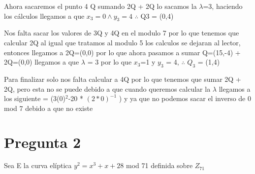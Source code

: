 \documentclass[10pt,a4paper]{article}
\begin{document}
\begin{itemize}
Ahora sacaremos el punto 4 Q sumando 2Q + 2Q lo sacamos la $\lambda$=3, haciendo los cálculos llegamos a que $x_3 =0 \land y_3= 4$ $\therefore$ Q3 = (0,4)\vspace{.3cm}

Nos falta sacar los valores de 3Q y 4Q en el modulo 7 por lo que tenemos que calcular 2Q al igual que tratamos al modulo 5 los calculos se dejaran al lector, entonces llegamos a 2Q=(0,0) por lo que ahora   pasamos a sumar Q=(15,-4) + 2Q=(0,0)  llegamos a que $\lambda$ = 3  por lo que $x_3$=1 y $y_3$ = 4, $\therefore$ $Q_3$ = (1,4) \vspace{.3cm}

Para finalizar solo nos falta calcular a 4Q por lo que tenemos que sumar 2Q + 2Q, pero esta no se puede debido a que cuando queremos calcular la $\lambda$ llegamos a los siguiente = (3(0)$^2$-20 * $(2*0)^{-1}$ ) y ya que no podemos sacar el inverso de 0 mod 7 debido a que no existe  \vspace{.3cm}    

\end{itemize}

\section{Pregunta 2}

Sea E la curva elíptica $y^2=x^3 + x +28 $ mod 71 definida sobre $Z_{71}$
 
\end{document}
